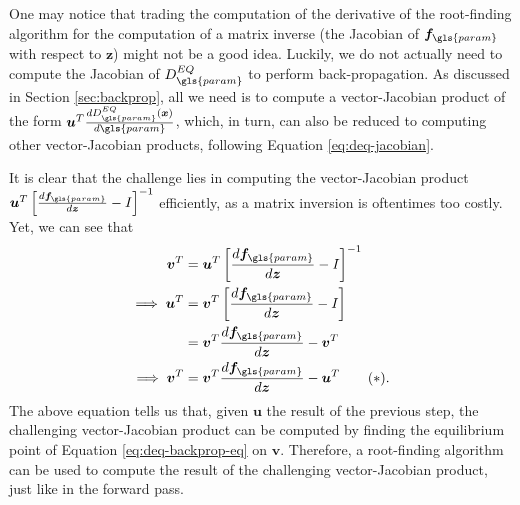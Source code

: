 One may notice that trading the computation of the derivative of the root-finding algorithm for the computation of a matrix inverse (the Jacobian of $\bm{f}_{\gls{param}}$ with respect to $\bm{z}$) might not be a good idea.
Luckily, we do not actually need to compute the Jacobian of $D^{EQ}_{\gls{param}}$ to perform back-propagation.
As discussed in Section \ref{sec:backprop}, all we need is to compute a vector-Jacobian product of the form $\bm{u}^T\frac{d D^{EQ}_{\gls{param}}(\bm{x})}{d \gls{param}}$, which, in turn, can also be reduced to computing other vector-Jacobian products, following Equation \eqref{eq:deq-jacobian}.

It is clear that the challenge lies in computing the vector-Jacobian product $\bm{u}^T\left[ \frac{d \bm{f}_{\gls{param}}}{d \bm{z}} - I \right]^{-1}$ efficiently, as a matrix inversion is oftentimes too costly.
Yet, we can see that
\begin{align*}
    \bm{v}^T &= \bm{u}^T\left[ \frac{d \bm{f}_{\gls{param}}}{d \bm{z}} - I \right]^{-1} \\
    \implies \bm{u}^T &= \bm{v}^T\left[ \frac{d \bm{f}_{\gls{param}}}{d \bm{z}} - I \right] \\
		      &= \bm{v}^T \frac{d \bm{f}_{\gls{param}}}{d \bm{z}} - \bm{v}^T \\
    \implies \bm{v}^T &= \bm{v}^T \frac{d \bm{f}_{\gls{param}}}{d \bm{z}} - \bm{u}^T \tag{$*$}\label{eq:deq-backprop-eq}
.\end{align*}
The above equation tells us that, given $\bm{u}$ the result of the previous step, the challenging vector-Jacobian product can be computed by finding the equilibrium point of Equation \eqref{eq:deq-backprop-eq} on $\bm{v}$.
Therefore, a root-finding algorithm can be used to compute the result of the challenging vector-Jacobian product, just like in the forward pass.

